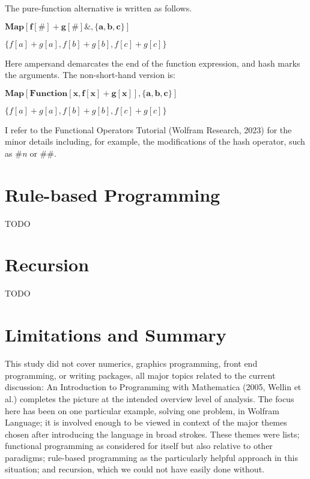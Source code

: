 \documentclass{article}
\begin{document}
The pure-function alternative is written as follows.

\begin{doublespace}
\noindent\(\pmb{\text{Map}[f[\#]+g[\#]\&,\{a,b,c\}]}\)
\end{doublespace}

\begin{doublespace}
\noindent\(\{f[a]+g[a],f[b]+g[b],f[c]+g[c]\}\)
\end{doublespace}

Here ampersand demarcates the end of the function expression, and hash marks the arguments. The non-short-hand version is:

\begin{doublespace}
\noindent\(\pmb{\text{Map}[\text{Function}[x,f[x]+ g[x]],\{a,b,c\}]}\)
\end{doublespace}

\begin{doublespace}
\noindent\(\{f[a]+g[a],f[b]+g[b],f[c]+g[c]\}\)
\end{doublespace}

I refer to the Functional Operators Tutorial (Wolfram Research, 2023) for the minor details including, for example, the modifications of the hash
operator, such as \textit{ $\#$n} or \textit{ $\#\#$}. 


\section*{Rule-based Programming}

TODO

\section*{Recursion}

TODO

\section*{Limitations and Summary}

This study did not cover numerics, graphics programming, { }front end programming, or writing packages, all major topics related to the current discussion:
An Introduction to Programming with Mathematica (2005, Wellin et al.) completes the picture at the intended overview level of analysis. The focus
here has been on one particular example, solving one problem, in Wolfram Language; it is involved enough to be viewed in context of the major themes
chosen after introducing the language in broad strokes. These themes were lists; functional programming as considered for itself but also relative
to other paradigms; rule-based programming as the particularly helpful approach in this situation; and recursion, which we could not have easily
done without.
\end{document}
